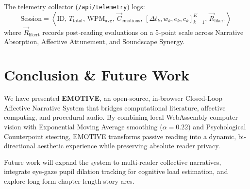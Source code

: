 \documentclass[sigconf,nonacm]{acmart}
\begin{document}
The telemetry collector (\texttt{/api/telemetry}) logs:
\begin{equation}
\text{Session} = \left\langle \text{ID}, \, T_{\text{total}}, \, \text{WPM}_{\text{avg}}, \, \vec{C}_{\text{emotions}}, \, \left[\Delta t_k, w_k, e_k, c_k\right]_{k=1}^K, \, \vec{R}_{\text{likert}} \right\rangle
\end{equation}
where $\vec{R}_{\text{likert}}$ records post-reading evaluations on a 5-point scale across Narrative Absorption, Affective Attunement, and Soundscape Synergy.

\section{Conclusion \& Future Work}

We have presented \textbf{EMOTIVE}, an open-source, in-browser Closed-Loop Affective Narrative System that bridges computational literature, affective computing, and procedural audio. By combining local WebAssembly computer vision with Exponential Moving Average smoothing ($\alpha = 0.22$) and Psychological Counterpoint steering, EMOTIVE transforms passive reading into a dynamic, bi-directional aesthetic experience while preserving absolute reader privacy.

Future work will expand the system to multi-reader collective narratives, integrate eye-gaze pupil dilation tracking for cognitive load estimation, and explore long-form chapter-length story arcs.
\end{document}
